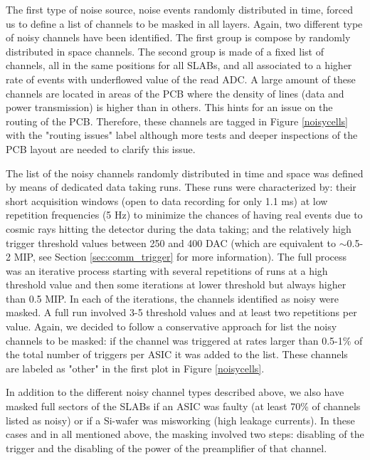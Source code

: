 \documentclass[a4paper,11pt]{article}
\begin{document}
The first type of noise source, noise events randomly distributed in time,
forced us to define a list of channels to be masked in all 
layers. Again, two different type of noisy channels have been identified. 
The first group is compose by randomly distributed in space channels.
The second group is made of
a fixed list of channels, all in the same positions for all SLABs,
and all associated to a higher rate of events with underflowed value
of the read ADC.
A large amount of these channels are located
in areas of the PCB where the density of lines 
(data and power transmission) is higher than in others.
This hints for an issue on the routing of the PCB.
Therefore, these channels are tagged in Figure \ref{noisycells} with the "routing issues" label
although more tests and deeper inspections of the PCB layout are needed to clarify this issue.

The list of the noisy channels randomly distributed in time and space was
defined by means of dedicated data taking runs. 
These runs were characterized by: their short acquisition windows (open to data recording for 
only 1.1 ms) at low repetition frequencies (5 Hz) to minimize the chances of having real events due to cosmic rays 
hitting the detector during the
data taking; and the relatively high trigger threshold values between 250 and 400 DAC 
(which are equivalent to $\sim$0.5-2 MIP, see Section \ref{sec:comm_trigger} for more 
information). The full process was an iterative process starting with several repetitions
of runs at a high threshold value and then some iterations at lower threshold but always 
higher than 0.5 MIP. 
In each of the iterations, the channels identified as noisy were masked.
A full run involved 3-5 threshold values and at least two repetitions per value.
Again, we decided to follow a conservative approach for list the noisy channels to be masked:
if the channel was triggered at rates larger than 0.5-1\% of the total number of triggers per ASIC
it was added to the list. These channels are labeled as "other" in the first plot in  Figure \ref{noisycells}.

In addition to the different noisy channel types described above, we also have
masked full sectors of the SLABs if an ASIC was faulty (at least 70\% of channels 
listed as noisy) or if a Si-wafer was misworking (high leakage currents). In these cases 
and in all mentioned above, the masking involved two steps: disabling of the trigger and 
the disabling of the power of the preamplifier of that channel.
\end{document}
